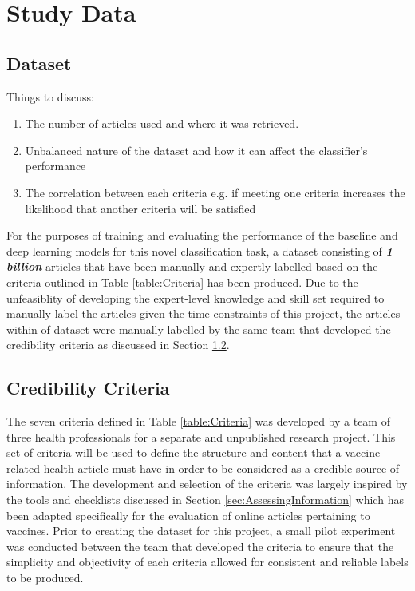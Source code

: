 \documentclass[a4paper,twoside,phd]{BYUPhys}
\begin{document}
\section{Study Data}
\label{sec:StudyData}

\subsection{Dataset}
\label{sec:Dataset}

Things to discuss:
\begin{enumerate}[-]
	\item The number of articles used and where it was retrieved.
	\item Unbalanced nature of the dataset and how it can affect the classifier's performance
	\item The correlation between each criteria e.g. if meeting one criteria increases the likelihood that another criteria will be satisfied
\end{enumerate}

For the purposes of training and evaluating the performance of the baseline and deep learning models for this novel classification task, a dataset consisting of \textbf{\textit{1 billion}} articles that have been manually and expertly labelled based on the criteria outlined in Table \ref{table:Criteria} has been produced. Due to the unfeasiblity of developing the expert-level knowledge and skill set required to manually label the articles given the time constraints of this project, the articles within of dataset were manually labelled by the same team that developed the credibility criteria as discussed in Section \ref{sec:CredibilityCriteria}.

\subsection{Credibility Criteria}
\label{sec:CredibilityCriteria}
The seven criteria defined in Table \ref{table:Criteria} was developed by a team of three health professionals for a separate and unpublished research project. This set of criteria will be used to define the structure and content that a vaccine-related health article must have in order to be considered as a credible source of information. The development and selection of the criteria was largely inspired by the tools and checklists discussed in Section \ref{sec:AssessingInformation} which has been adapted specifically for the evaluation of online articles pertaining to vaccines. Prior to creating the dataset for this project, a small pilot experiment was conducted between the team that developed the criteria to ensure that the simplicity and objectivity of each criteria allowed for consistent and reliable labels to be produced.
\end{document}
